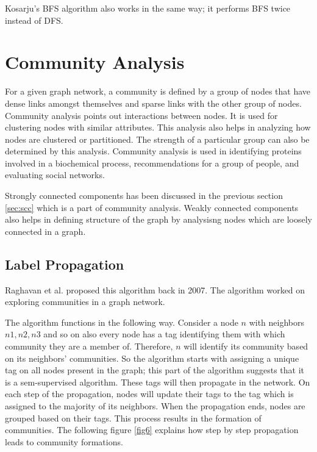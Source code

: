 \documentclass[journal,twoside,web]{ieeecolor}
\begin{document}
Kosarju's BFS algorithm also works in the same way; it performs BFS twice instead of DFS.

\section{Community Analysis}
\label{sec:community}
For a given graph network, a community is defined by a group of nodes that have dense links amongst themselves and sparse links with the other group of nodes. Community analysis points out interactions between nodes. It is used for clustering nodes with similar attributes. This analysis also helps in analyzing how nodes are clustered or partitioned. The strength of a particular group can also be determined by this analysis. Community analysis is used in identifying proteins involved in a biochemical process, recommendations for a group of people, and evaluating social networks. 

Strongly connected components has been discussed in the previous section \ref{sec:scc} which is a part of community analysis. Weakly connected components also helps in defining structure of the graph by analysisng nodes which are loosely connected in a graph.

\subsection{Label Propagation}
Raghavan et al. proposed this algorithm back in 2007\cite{16}. The algorithm worked on exploring communities in a graph network. 

The algorithm functions in the following way. Consider a node $n$ with neighbors $n1, n2, n3$ and so on also every node has a tag identifying them with which community they are a member of. Therefore, $n$ will identify its community based on its neighbors' communities. So the algorithm starts with assigning a unique tag on all nodes present in the graph; this part of the algorithm suggests that it is a sem-supervised algorithm. These tags will then propagate in the network. On each step of the propagation, nodes will update their tags to the tag which is assigned to the majority of its neighbors. When the propagation ends, nodes are grouped based on their tags. This process results in the formation of communities. The following figure \ref{fig6} explains how step by step propagation leads to community formations.
\end{document}
